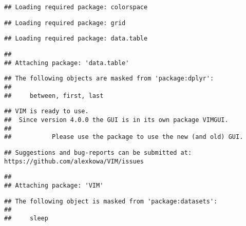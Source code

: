 \documentclass[]{article}
\begin{document}
\begin{verbatim}
## Loading required package: colorspace
\end{verbatim}

\begin{verbatim}
## Loading required package: grid
\end{verbatim}

\begin{verbatim}
## Loading required package: data.table
\end{verbatim}

\begin{verbatim}
## 
## Attaching package: 'data.table'
\end{verbatim}

\begin{verbatim}
## The following objects are masked from 'package:dplyr':
## 
##     between, first, last
\end{verbatim}

\begin{verbatim}
## VIM is ready to use. 
##  Since version 4.0.0 the GUI is in its own package VIMGUI.
## 
##           Please use the package to use the new (and old) GUI.
\end{verbatim}

\begin{verbatim}
## Suggestions and bug-reports can be submitted at: https://github.com/alexkowa/VIM/issues
\end{verbatim}

\begin{verbatim}
## 
## Attaching package: 'VIM'
\end{verbatim}

\begin{verbatim}
## The following object is masked from 'package:datasets':
## 
##     sleep
\end{verbatim}
\end{document}
